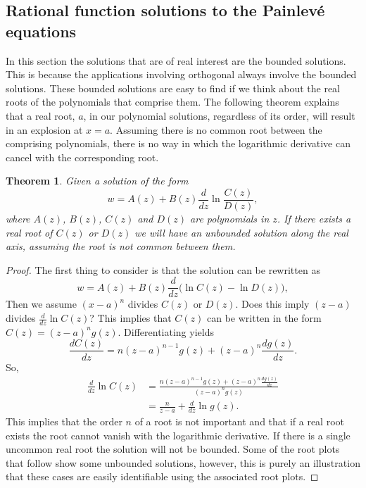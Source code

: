 \documentclass[12pt]{article}
\def\P{Painlev\'e }
\newtheorem{mydef}{Theorem}[section]
\numberwithin{figure}{section}
\numberwithin{equation}{section}
\numberwithin{table}{section}
\begin{document}
\subsection{Rational function solutions to the \P equations}
In this section the solutions that are of real interest are the bounded solutions. This is because the applications involving orthogonal always involve the bounded solutions. These bounded solutions are easy to find if we think about the real roots of the polynomials that comprise them. The following theorem explains that a real root, $a$, in our polynomial solutions, regardless of its order, will result in an explosion at $x=a$. Assuming there is no common root between the comprising polynomials, there is no way in which the logarithmic derivative can cancel with the corresponding root.
\begin{mydef}
Given a solution of the form $$w=A(z)+B(z)\frac{d}{dz}\ln \frac{C(z)}{D(z)},$$
where $A(z)$, $B(z)$, $C(z)$ and $D(z)$ are polynomials in $z$. If there exists a real root of $C(z)$ or $D(z)$ we will have an unbounded solution along the real axis, assuming the root is not common between them.
\end{mydef}
\begin{proof}
The first thing to consider is that the solution can be rewritten as
$$w=A(z)+B(z)\frac{d}{dz}\bigg(\ln{C(z)}-\ln D(z)\bigg),$$
Then we assume $(x-a)^n$ divides $C(z)$ or $D(z)$. Does this imply $(z-a)$ divides $\frac{d}{dz}\ln C(z)$?
This implies that $C(z)$ can be written in the form $C(z)=(z-a)^ng(z)$. Differentiating yields $$\frac{dC(z)}{dz}=n(z-a)^{n-1}g(z)+(z-a)^n\frac{dg(z)}{dz}.$$
So,
\begin{align}
\frac{d}{dz}\ln C(z)&=\frac{n(z-a)^{n-1}g(z)+(z-a)^n\frac{dg(z)}{dz}}{(z-a)^ng(z)}\\
&=\frac{n}{z-a}+\frac{d}{dz}\ln g(z).
\end{align}
This implies that the order $n$ of a root is not important and that if a real root exists the root cannot vanish with the logarithmic derivative. If there is a single uncommon real root the solution will not be bounded. Some of the root plots that follow show some unbounded solutions, however, this is purely an illustration that these cases are easily identifiable using the associated root plots.
\end{proof}
\end{document}

